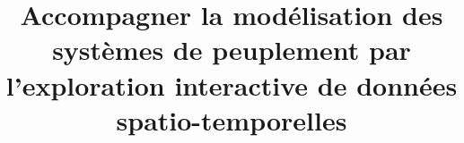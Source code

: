 \documentclass[12pt, a4paper, oneside, notitlepage]{report}
\title{Accompagner la modélisation des systèmes de peuplement par l’exploration interactive de données spatio-temporelles}
\date{\vspace{-5ex}}
\makeatletter
\newcommand*{\toccontents}{\@starttoc{toc}}
\makeatother
\begin{document}
	\setcounter{secnumdepth}{4}
	
\begin{titlepage}
	\maketitle
	
	\begin{NoHyper} %
		\toccontents
	\end{NoHyper}
\end{titlepage}
	

\graphicspath{{chap1/}}
\setcounter{chapter}{0}


\setcounter{part}{0}


\graphicspath{{chap2/}}
\setcounter{chapter}{1}


\graphicspath{{chap3/}}
\setcounter{chapter}{2}


\graphicspath{{chap4/}}
\setcounter{chapter}{3}


\setcounter{part}{1}


\graphicspath{{chap5/}}
\setcounter{chapter}{4}


\graphicspath{{chap6/}}
\setcounter{chapter}{5}


\setcounter{part}{2}


\graphicspath{{chap7/}}
\setcounter{chapter}{6}



\graphicspath{{chap8/}}
\setcounter{chapter}{7}

\end{document}
